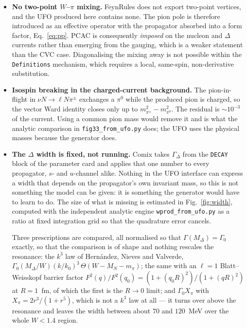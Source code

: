 \documentclass[11pt,a4paper]{article}
\newcommand{\code}[1]{\texttt{\small #1}}
\begin{document}
\begin{itemize}
\item \textbf{No two-point $W$--$\pi$ mixing.} FeynRules does not export
two-point vertices, and the UFO produced here contains none. The pion pole is
therefore introduced as an effective operator with the propagator absorbed into
a form factor, Eq.~\eqref{eq:pp}. PCAC is consequently \emph{imposed} on the
nucleon and $\Delta$ currents rather than emerging from the gauging, which is a
weaker statement than the CVC case. Diagonalising the mixing away is not
possible within the \code{Definitions} mechanism, which requires a local,
same-spin, non-derivative substitution.

\item \textbf{Isospin breaking in the charged-current background.} The
pion-in-flight in $\nu N \to \ell N \pi^\pm$ exchanges a $\pi^0$ while the
produced pion is charged, so the vector Ward identity closes only up to
$m_{\pi^\pm}^2 - m_{\pi^0}^2$. The residual is $\sim\!10^{-3}$ of the current.
Using a common pion mass would remove it and is what the analytic comparison in
\code{fig33\_from\_ufo.py} does; the UFO uses the physical masses because the
generator does.

\item \textbf{The $\Delta$ width is fixed, not running.}
\label{lim:width}
Comix takes $\Gamma_\Delta$ from the \code{DECAY} block of the parameter card
and applies that one number to every propagator, $s$- and $u$-channel alike.
Nothing in the UFO interface can express a width that depends on the
propagator's own invariant mass, so this is not something the model can be
given: it is something the generator would have to learn to do. The size of
what is missing is estimated in Fig.~\ref{fig:width}, computed with the
independent analytic engine \code{wprod\_from\_ufo.py} as a ratio at fixed
integration grid so that the quadrature error cancels.

Three prescriptions are compared, all normalised so that
$\Gamma(M_\Delta) = \Gamma_0$ exactly, so that the comparison is of shape and
nothing rescales the resonance: the $k^3$ law of Hern\'andez, Nieves and
Valverde, $\Gamma_0 (M_\Delta/W)(k/k_0)^3\,\Theta(W - M_N - m_\pi)$; the same
with an $\ell=1$ Blatt--Weisskopf barrier factor
$F^2(q)/F^2(q_0) = (1+(q_0R)^2)/(1+(qR)^2)$ at $R = 1$~fm, of which the first is
the $R\to0$ limit; and $\Gamma_0 X_\pi$ with $X_\pi = 2r^3/(1+r^5)$, which is
not a $k^3$ law at all --- it turns over above the resonance and leaves the
width between about $70$ and $120$~MeV over the whole $W<1.4$ region.


\end{itemize}
\end{document}
